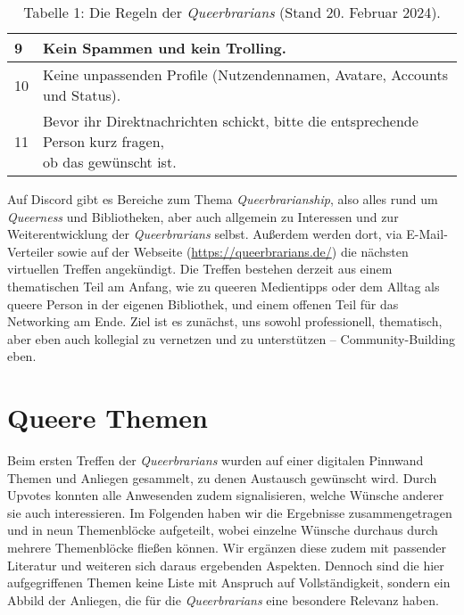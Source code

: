 \documentclass[a4paper,
fontsize=11pt,
oneside,
numbers=noperiodatend,
parskip=half-,
bibliography=totoc,
final
]{scrartcl}
\begin{document}
\begin{table}[h]
\begin{tabular}{|ll|}
\multicolumn{1}{|l|}{9}  & Kein Spammen und kein Trolling.                                                                                                                                               \\ \hline
\multicolumn{1}{|l|}{10} & Keine unpassenden Profile (Nutzendennamen, Avatare, Accounts und Status).                                                                                                   \\ \hline
\multicolumn{1}{|l|}{11} & \makecell[tl]{Bevor ihr Direktnachrichten schickt, bitte die entsprechende Person kurz fragen,\\ ob das gewünscht ist.}                                                                                    \\ \hline
\end{tabular}
\caption{Tabelle 1: Die Regeln der \textit{Queerbrarians} (Stand 20. Februar 2024).}
\end{table}

Auf Discord gibt es Bereiche zum Thema \emph{Queerbrarianship}, also
alles rund um \emph{Queerness} und Bibliotheken, aber auch allgemein zu
Interessen und zur Weiterentwicklung der \emph{Queerbrarians} selbst.
Außerdem werden dort, via E-Mail-Verteiler sowie auf der Webseite
(\url{https://queerbrarians.de/}) die nächsten virtuellen Treffen
angekündigt. Die Treffen bestehen derzeit aus einem thematischen Teil am
Anfang, wie zu queeren Medientipps oder dem Alltag als queere Person in
der eigenen Bibliothek, und einem offenen Teil für das Networking am
Ende. Ziel ist es zunächst, uns sowohl professionell, thematisch, aber
eben auch kollegial zu vernetzen und zu unterstützen --
Community-Building eben.

\section{Queere Themen}\label{queere-themen}

Beim ersten Treffen der \emph{Queerbrarians} wurden auf einer digitalen
Pinnwand Themen und Anliegen gesammelt, zu denen Austausch gewünscht
wird. Durch Upvotes konnten alle Anwesenden zudem signalisieren, welche
Wünsche anderer sie auch interessieren. Im Folgenden haben wir die
Ergebnisse zusammengetragen und in neun Themenblöcke aufgeteilt, wobei
einzelne Wünsche durchaus durch mehrere Themenblöcke fließen können. Wir
ergänzen diese zudem mit passender Literatur und weiteren sich daraus
ergebenden Aspekten. Dennoch sind die hier aufgegriffenen Themen keine
Liste mit Anspruch auf Vollständigkeit, sondern ein Abbild der Anliegen,
die für die \emph{Queerbrarians} eine besondere Relevanz haben.
\end{document}

